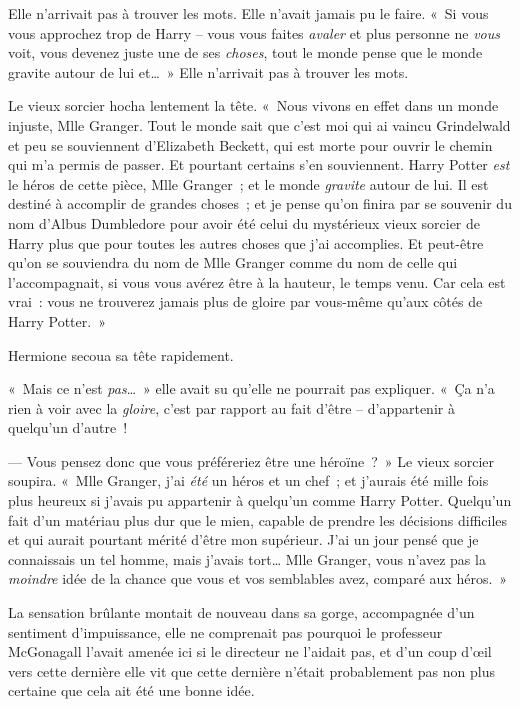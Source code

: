 Elle n'arrivait pas à trouver les mots.
Elle n'avait jamais pu le faire.
«~Si vous vous approchez trop de Harry -- vous vous faites \emph{avaler} et plus personne ne \emph{vous} voit, vous devenez juste une de ses \emph{choses}, tout le monde pense que le monde gravite autour de lui et…~»
Elle n'arrivait pas à trouver les mots.

Le vieux sorcier hocha lentement la tête.
«~Nous vivons en effet dans un monde injuste, Mlle Granger.
Tout le monde sait que c'est moi qui ai vaincu Grindelwald et peu se souviennent d'Elizabeth Beckett, qui est morte pour ouvrir le chemin qui m'a permis de passer.
Et pourtant certains s'en souviennent.
Harry Potter \emph{est} le héros de cette pièce, Mlle Granger~; et le monde \emph{gravite} autour de lui.
Il est destiné à accomplir de grandes choses~; et je pense qu'on finira par se souvenir du nom d'Albus Dumbledore pour avoir été celui du mystérieux vieux sorcier de Harry plus que pour toutes les autres choses que j'ai accomplies.
Et peut-être qu'on se souviendra du nom de Mlle Granger comme du nom de celle qui l'accompagnait, si vous vous avérez être à la hauteur, le temps venu.
Car cela est vrai~: vous ne trouverez jamais plus de gloire par vous-même qu'aux côtés de Harry Potter.~»

Hermione secoua sa tête rapidement.

«~Mais ce n'est \emph{pas}…~»
elle avait su qu'elle ne pourrait pas expliquer.
«~Ça n'a rien à voir avec la \emph{gloire}, c'est par rapport au fait d'être -- d'appartenir à quelqu'un d'autre~!

--- Vous pensez donc que vous préféreriez être une héroïne~?~»
Le vieux sorcier soupira.
«~Mlle Granger, j'ai \emph{été} un héros et un chef~; et j'aurais été mille fois plus heureux si j'avais pu appartenir à quelqu'un comme Harry Potter.
Quelqu'un fait d'un matériau plus dur que le mien, capable de prendre les décisions difficiles et qui aurait pourtant mérité d'être mon supérieur.
J'ai un jour pensé que je connaissais un tel homme, mais j'avais tort…
Mlle Granger, vous n'avez pas la \emph{moindre} idée de la chance que vous et vos semblables avez, comparé aux héros.~»

La sensation brûlante montait de nouveau dans sa gorge, accompagnée d'un sentiment d'impuissance, elle ne comprenait pas pourquoi le professeur McGonagall l'avait amenée ici si le directeur ne l'aidait pas, et d'un coup d'œil vers cette dernière elle vit que cette dernière n'était probablement pas non plus certaine que cela ait été une bonne idée.

